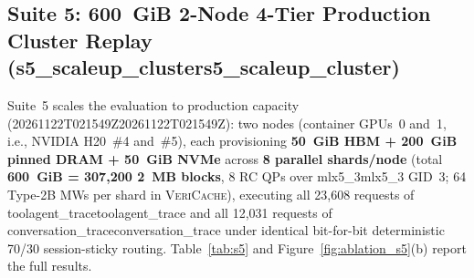 \documentclass[11pt,a4paper]{article}
\let\origunderscore\_
\DeclareRobustCommand{\code}[1]{{\ttfamily\ifmmode #1\else\def\_{\origunderscore\hspace{0pt}}#1\fi}}
\newcommand{\VC}{\textsc{VeriCache}}
\begin{document}
\subsection{Suite 5: 600~GiB 2-Node 4-Tier Production Cluster Replay (\code{s5\_scaleup\_cluster})}

Suite~5 scales the evaluation to production capacity (\code{20261122T021549Z}): two nodes (container GPUs~0 and~1, i.e., NVIDIA H20~\#4 and~\#5), each provisioning \textbf{50~GiB HBM + 200~GiB pinned DRAM + 50~GiB NVMe} across \textbf{8 parallel shards/node} (total \textbf{600~GiB = 307,200 2~MB blocks}, 8 RC QPs over \code{mlx5\_3} GID~3; 64 Type-2B MWs per shard in \VC{}), executing all 23,608 requests of \code{toolagent\_trace} and all 12,031 requests of \code{conversation\_trace} under identical bit-for-bit deterministic 70/30 session-sticky routing. Table~\ref{tab:s5} and Figure~\ref{fig:ablation_s5}(b) report the full results.
\end{document}
